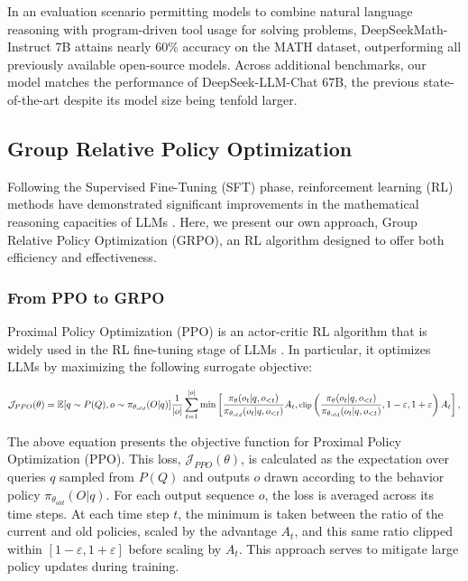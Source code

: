 \begin{itemize}[topsep=0pt]
\begin{itemize}[topsep=0pt]
In an evaluation scenario permitting models to combine natural language reasoning with program-driven tool usage for solving problems, DeepSeekMath-Instruct 7B attains nearly 60\% accuracy on the MATH dataset, outperforming all previously available open-source models. Across additional benchmarks, our model matches the performance of DeepSeek-LLM-Chat 67B, the previous state-of-the-art despite its model size being tenfold larger.

\subsection{Group Relative Policy Optimization} Following the Supervised Fine-Tuning (SFT) phase, reinforcement learning (RL) methods have demonstrated significant improvements in the mathematical reasoning capacities of LLMs \citep{wang2023math,wizardmath}. Here, we present our own approach, Group Relative Policy Optimization (GRPO), an RL algorithm designed to offer both efficiency and effectiveness.

\subsubsection{From PPO to GRPO} Proximal Policy Optimization (PPO) \citep{schulman2017proximal} is an actor-critic RL algorithm that is widely used in the RL fine-tuning stage of LLMs \citep{ouyang2022training}. In particular, it optimizes LLMs by maximizing the following surrogate objective:

\begin{equation}
\footnotesize
    \mathcal{J}_{PPO}(\theta) = \mathbb{E}{[q \sim P(Q), o \sim \pi_{\theta_{old}}(O|q)]} \frac{1}{|o|} \sum_{t=1}^{|o|} \min \left[ \frac{\pi_\theta(o_{t} | q, o_{<t})}{\pi_{\theta_{old}}(o_{t} | q, o_{<t})} A_{t}, \text{clip} \left( \frac{\pi_\theta(o_{t} | q, o_{<t})}{\pi_{\theta_{old}}(o_{t} | q, o_{<t})}, 1 - \varepsilon, 1 + \varepsilon \right)  A_{t} \right] ,
\end{equation}

The above equation presents the objective function for Proximal Policy Optimization (PPO). This loss, $\mathcal{J}_{PPO}(\theta)$, is calculated as the expectation over queries $q$ sampled from $P(Q)$ and outputs $o$ drawn according to the behavior policy $\pi_{\theta_{old}}(O|q)$. For each output sequence $o$, the loss is averaged across its time steps. At each time step $t$, the minimum is taken between the ratio of the current and old policies, scaled by the advantage $A_t$, and this same ratio clipped within $[1-\varepsilon, 1+\varepsilon]$ before scaling by $A_t$. This approach serves to mitigate large policy updates during training.


\end{itemize}
\end{itemize}
